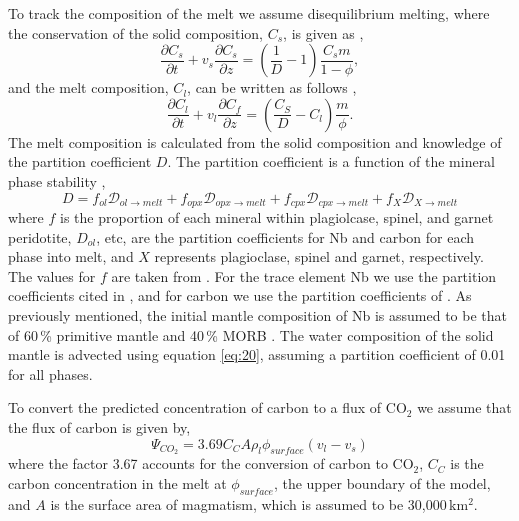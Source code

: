 \documentclass[draft,grl]{agutexSI2018}
\begin{document}
\begin{article}
To track the composition of the melt we assume disequilibrium melting, where the conservation of the solid composition, $C_{s}$, is given as \citep{spiegelman-1996},
\begin{equation}
\frac{\partial C_{s}}{\partial t} + v_{s}\frac{\partial C_{s}}{\partial z} = \left(\frac{1}{D} - 1\right) \frac{C_{s}m}{1-\phi},
\label{eq:20}
\end{equation}
and the melt composition, $C_{l}$, can be written as follows \citep{spiegelman-1996},
\begin{equation}
\frac{\partial C_{l}}{\partial t} + v_{l}\frac{\partial C_{f}}{\partial z} = \left(\frac{C_{S}}{D} - C_{l}\right)\frac{m}{\phi}.
\label{eq:21}
\end{equation}
The melt composition is calculated from the solid composition and knowledge of the partition coefficient $D$. The partition coefficient is a function of the mineral phase stability \citep{mckenzie-1991},
\begin{equation}
D = f_{ol}\mathcal{D}_{ol\rightarrow melt} + f_{opx}\mathcal{D}_{opx\rightarrow melt} + f_{cpx}\mathcal{D}_{cpx\rightarrow melt} + f_{X}\mathcal{D}_{X\rightarrow melt}
\label{eq:22}
\end{equation}
where $f$ is the proportion of each mineral within plagiolcase, spinel, and garnet peridotite, $D_{ol}$, etc, are the partition coefficients for Nb and carbon for each phase into melt, and $X$ represents plagioclase, spinel and garnet, respectively. The values for $f$ are taken from \citet{gibson-2010}. For the trace element Nb we use the partition coefficients cited in \citet{gurenko-1995}, and for carbon we use the partition coefficients of \citet{rosenthal-etal-2015}. As previously mentioned, the initial mantle composition of Nb is assumed to be that of 60\,\% primitive mantle and 40\,\% MORB \citep{shorttle-2011}. The water composition of the solid mantle is advected using equation \ref{eq:20}, assuming a partition coefficient of 0.01 for all phases.

To convert the predicted concentration of carbon to a flux of CO$_{2}$ we assume that the flux of carbon is given by,
\begin{equation}
\Psi_{CO_{2}} = 3.69 C_{C} A\rho_{l} \phi_{surface} \left(v_{l} - v_{s} \right)
\label{eq:23}
\end{equation}
where the factor 3.67 accounts for the conversion of carbon to CO$_{2}$, $C_{C}$ is the carbon concentration in the melt at $\phi_{surface}$, the upper boundary of the model, and $A$ is the surface area of magmatism, which is assumed to be 30,000\,km$^{2}$.


\end{article}
\end{document}
